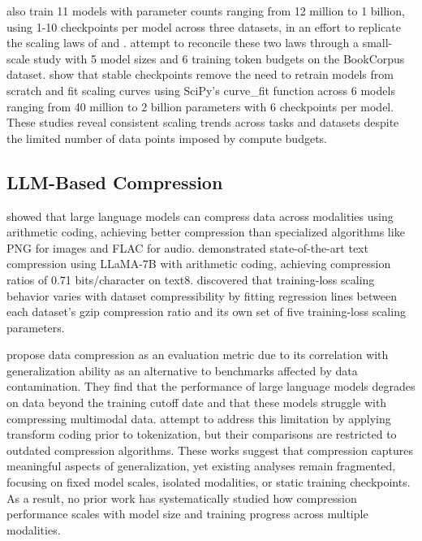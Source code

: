 \documentclass[11pt]{article}
\begin{document}
\citet{li2025scaling} also train 11 models with parameter counts ranging from 12 million to 1 billion, using 1-10 checkpoints per model across three datasets, in an effort to replicate the scaling laws of \citet{kaplan2020scaling} and \citet{hoffmann2022scaling}. \citet{pearce2025scaling} attempt to reconcile these two laws through a small-scale study with 5 model sizes and 6 training token budgets on the BookCorpus dataset. \citet{hu2024scaling} show that stable checkpoints remove the need to retrain models from scratch and fit scaling curves using SciPy’s curve\_fit function across 6 models ranging from 40 million to 2 billion parameters with 6 checkpoints per model. These studies reveal consistent scaling trends across tasks and datasets despite the limited number of data points imposed by compute budgets.


\subsection{LLM-Based Compression}

\citet{deletang2023compression} showed that large language models can compress data across modalities using arithmetic coding, achieving better compression than specialized algorithms like PNG for images and FLAC for audio. \citet{kaushik2023llmzip} demonstrated state-of-the-art text compression using LLaMA-7B with arithmetic coding, achieving compression ratios of 0.71 bits/character on text8. \citet{pandey2024compression} discovered that training-loss scaling behavior varies with dataset compressibility by fitting regression lines between each dataset’s gzip compression ratio and its own set of five training-loss scaling parameters.

\citet{li2024llmzip} propose data compression as an evaluation metric due to its correlation with generalization ability as an alternative to benchmarks affected by data contamination. They find that the performance of large language models degrades on data beyond the training cutoff date and that these models struggle with compressing multimodal data. \citet{zhang2024llmzip} attempt to address this limitation by applying transform coding prior to tokenization, but their comparisons are restricted to outdated compression algorithms. These works suggest that compression captures meaningful aspects of generalization, yet existing analyses remain fragmented, focusing on fixed model scales, isolated modalities, or static training checkpoints. As a result, no prior work has systematically studied how compression performance scales with model size and training progress across multiple modalities.
\end{document}
